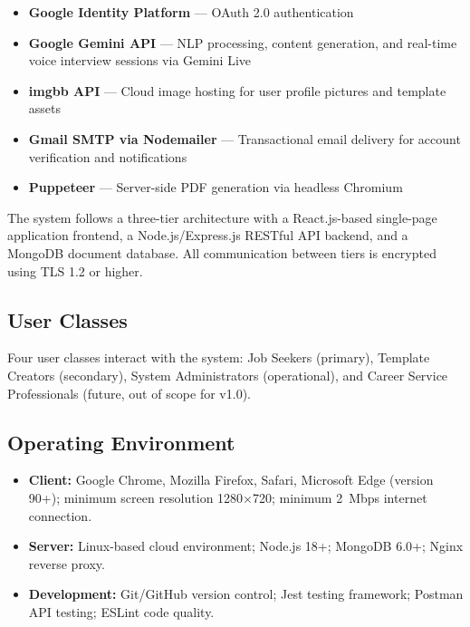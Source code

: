 \documentclass[12pt, a4paper, oneside]{report}
\begin{document}
\begin{itemize}
    \item \textbf{Google Identity Platform} --- OAuth 2.0 authentication \cite{oauth2012}
    \item \textbf{Google Gemini API} \cite{gemini2023} --- NLP processing, content generation, and real-time voice interview sessions via Gemini Live \cite{geminidocs2024}
    \item \textbf{imgbb API} \cite{imgbb2024} --- Cloud image hosting for user profile pictures and template assets
    \item \textbf{Gmail SMTP via Nodemailer} --- Transactional email delivery for account verification and notifications
    \item \textbf{Puppeteer} \cite{puppeteer2024} --- Server-side PDF generation via headless Chromium
\end{itemize}

The system follows a three-tier architecture with a React.js-based single-page application frontend, a Node.js/Express.js RESTful API backend, and a MongoDB document database. All communication between tiers is encrypted using TLS 1.2 or higher.

\subsection{User Classes}

Four user classes interact with the system: Job Seekers (primary), Template Creators (secondary), System Administrators (operational), and Career Service Professionals (future, out of scope for v1.0).

\subsection{Operating Environment}

\begin{itemize}
    \item \textbf{Client:} Google Chrome, Mozilla Firefox, Safari, Microsoft Edge (version 90+); minimum screen resolution 1280$\times$720; minimum 2~Mbps internet connection.
    \item \textbf{Server:} Linux-based cloud environment; Node.js 18+; MongoDB 6.0+; Nginx reverse proxy.
    \item \textbf{Development:} Git/GitHub version control; Jest testing framework; Postman API testing; ESLint code quality.
\end{itemize}
\end{document}
